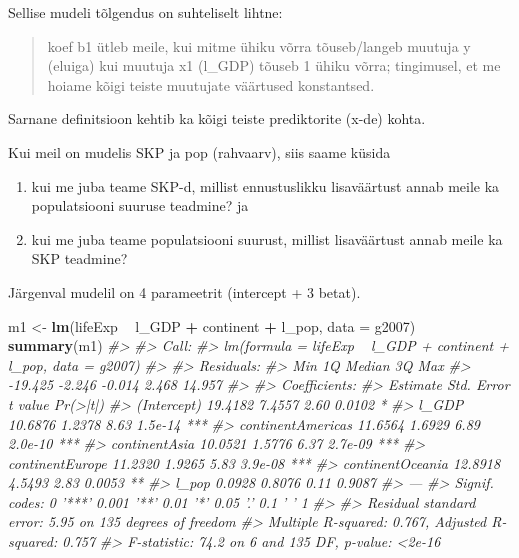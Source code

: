 \documentclass[]{book}
\newenvironment{Shaded}{\begin{snugshade}}{\end{snugshade}}
\newcommand{\KeywordTok}[1]{\textcolor[rgb]{0.13,0.29,0.53}{\textbf{#1}}}
\newcommand{\DataTypeTok}[1]{\textcolor[rgb]{0.13,0.29,0.53}{#1}}
\newcommand{\StringTok}[1]{\textcolor[rgb]{0.31,0.60,0.02}{#1}}
\newcommand{\CommentTok}[1]{\textcolor[rgb]{0.56,0.35,0.01}{\textit{#1}}}
\newcommand{\OperatorTok}[1]{\textcolor[rgb]{0.81,0.36,0.00}{\textbf{#1}}}
\newcommand{\NormalTok}[1]{#1}
\begin{document}
Sellise mudeli tõlgendus on suhteliselt lihtne:

\begin{quote}
koef b1 ütleb meile, kui mitme ühiku võrra tõuseb/langeb muutuja y
(eluiga) kui muutuja x1 (l\_GDP) tõuseb 1 ühiku võrra; tingimusel, et me
hoiame kõigi teiste muutujate väärtused konstantsed.
\end{quote}

Sarnane definitsioon kehtib ka kõigi teiste prediktorite (x-de) kohta.

Kui meil on mudelis SKP ja pop (rahvaarv), siis saame küsida

\begin{enumerate}
\def\labelenumi{\arabic{enumi})}
\item
  kui me juba teame SKP-d, millist ennustuslikku lisaväärtust annab
  meile ka populatsiooni suuruse teadmine? ja
\item
  kui me juba teame populatsiooni suurust, millist lisaväärtust annab
  meile ka SKP teadmine?
\end{enumerate}

Järgenval mudelil on 4 parameetrit (intercept + 3 betat).

\begin{Shaded}
\begin{Highlighting}[]
\NormalTok{m1 <-}\StringTok{ }\KeywordTok{lm}\NormalTok{(lifeExp }\OperatorTok{~}\StringTok{ }\NormalTok{l_GDP }\OperatorTok{+}\StringTok{ }\NormalTok{continent }\OperatorTok{+}\StringTok{ }\NormalTok{l_pop, }\DataTypeTok{data =}\NormalTok{ g2007)}
\KeywordTok{summary}\NormalTok{(m1)}
\CommentTok{#> }
\CommentTok{#> Call:}
\CommentTok{#> lm(formula = lifeExp ~ l_GDP + continent + l_pop, data = g2007)}
\CommentTok{#> }
\CommentTok{#> Residuals:}
\CommentTok{#>     Min      1Q  Median      3Q     Max }
\CommentTok{#> -19.425  -2.246  -0.014   2.468  14.957 }
\CommentTok{#> }
\CommentTok{#> Coefficients:}
\CommentTok{#>                   Estimate Std. Error t value Pr(>|t|)    }
\CommentTok{#> (Intercept)        19.4182     7.4557    2.60   0.0102 *  }
\CommentTok{#> l_GDP              10.6876     1.2378    8.63  1.5e-14 ***}
\CommentTok{#> continentAmericas  11.6564     1.6929    6.89  2.0e-10 ***}
\CommentTok{#> continentAsia      10.0521     1.5776    6.37  2.7e-09 ***}
\CommentTok{#> continentEurope    11.2320     1.9265    5.83  3.9e-08 ***}
\CommentTok{#> continentOceania   12.8918     4.5493    2.83   0.0053 ** }
\CommentTok{#> l_pop               0.0928     0.8076    0.11   0.9087    }
\CommentTok{#> ---}
\CommentTok{#> Signif. codes:  0 '***' 0.001 '**' 0.01 '*' 0.05 '.' 0.1 ' ' 1}
\CommentTok{#> }
\CommentTok{#> Residual standard error: 5.95 on 135 degrees of freedom}
\CommentTok{#> Multiple R-squared:  0.767,  Adjusted R-squared:  0.757 }
\CommentTok{#> F-statistic: 74.2 on 6 and 135 DF,  p-value: <2e-16}
\end{Highlighting}
\end{Shaded}
\end{document}
